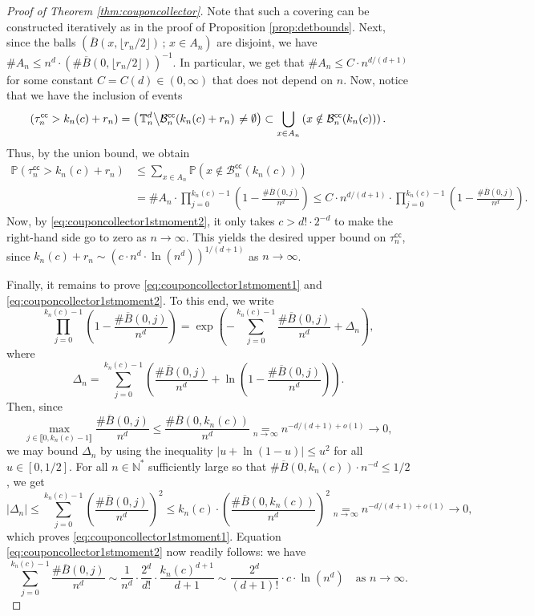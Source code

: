 \documentclass[10pt,a4paper]{amsart}
\theoremstyle{plain}
\theoremstyle{remark}
\begin{document}
\begin{proof}[Proof of Theorem \ref{thm:couponcollector}]
Note that such a covering can be constructed iteratively as in the proof of Proposition \ref{prop:detbounds}.
Next, since the balls $\left(\overline{B}(x,\lfloor r_n/2\rfloor)\,;\,x\in A_n\right)$ are disjoint, we have ${\#A_n\leq n^d\cdot\left(\#\overline{B}(0,\lfloor r_n/2\rfloor)\right)^{-1}}$.
In particular, we get that $\#A_n\leq C\cdot n^{d/(d+1)}$ for some constant $C=C(d)\in(0,\infty)$ that does not depend on $n$.
Now, notice that we have the inclusion of events
\[\left(\tau_n^\mathsf{cc}>k_n(c)+r_n\right)=\left(\left.\mathbb{T}_n^d\middle\backslash\mathcal{B}_n^\mathsf{cc}(k_n(c)+r_n)\right.\neq\emptyset\right)\subset\bigcup_{x\in A_n}\left(x\notin\mathcal{B}_n^\mathsf{cc}(k_n(c))\right).\]
Thus, by the union bound, we obtain
\[\begin{split}
\mathbb{P}\left(\tau_n^\mathsf{cc}>k_n(c)+r_n\right)&\leq\sum_{x\in A_n}\mathbb{P}\left(x\notin\mathcal{B}_n^\mathsf{cc}(k_n(c))\right)\\
&=\#A_n\cdot\prod_{j=0}^{k_n(c)-1}\left(1-\frac{\#\overline{B}(0,j)}{n^d}\right)\leq C\cdot n^{d/(d+1)}\cdot\prod_{j=0}^{k_n(c)-1}\left(1-\frac{\#\overline{B}(0,j)}{n^d}\right).
\end{split}\]
Now, by \eqref{eq:couponcollector1stmoment2}, it only takes $c>d!\cdot2^{-d}$ to make the right-hand side go to zero as $n\to\infty$.
This yields the desired upper bound on $\tau_n^\mathsf{cc}$, since $k_n(c)+r_n\sim\left(c\cdot n^d\cdot\ln\left(n^d\right)\right)^{1/(d+1)}$ as $n\to\infty$.

Finally, it remains to prove \eqref{eq:couponcollector1stmoment1} and \eqref{eq:couponcollector1stmoment2}.
To this end, we write
\[\prod_{j=0}^{k_n(c)-1}\left(1-\frac{\#\overline{B}(0,j)}{n^d}\right)=\exp\left(-\sum_{j=0}^{k_n(c)-1}\frac{\#\overline{B}(0,j)}{n^d}+\Delta_n\right),\]
where
\[\Delta_n=\sum_{j=0}^{k_n(c)-1}\left(\frac{\#\overline{B}(0,j)}{n^d}+\ln\left(1-\frac{\#\overline{B}(0,j)}{n^d}\right)\right).\]
Then, since
\[\max_{j\in\llbracket0,k_n(c)-1\rrbracket}\frac{\#\overline{B}(0,j)}{n^d}\leq\frac{\#\overline{B}(0,k_n(c))}{n^d}\underset{n\to\infty}{=}n^{-d/(d+1)+o(1)}\longrightarrow0,\]
we may bound $\Delta_n$ by using the inequality $|u+\ln(1-u)|\leq u^2$ for all $u\in[0,1/2]$.
For all $n\in\mathbb{N}^*$ sufficiently large so that $\#\overline{B}(0,k_n(c))\cdot n^{-d}\leq1/2$, we get
\[|\Delta_n|\leq\sum_{j=0}^{k_n(c)-1}\left(\frac{\#\overline{B}(0,j)}{n^d}\right)^2\leq k_n(c)\cdot\left(\frac{\#\overline{B}(0,k_n(c))}{n^d}\right)^2\underset{n\to\infty}{=}n^{-d/(d+1)+o(1)}\longrightarrow0,\]
which proves \eqref{eq:couponcollector1stmoment1}.
Equation \eqref{eq:couponcollector1stmoment2} now readily follows: we have
\[\sum_{j=0}^{k_n(c)-1}\frac{\#\overline{B}(0,j)}{n^d}\sim\frac{1}{n^d}\cdot\frac{2^d}{d!}\cdot\frac{k_n(c)^{d+1}}{d+1}\sim\frac{2^d}{(d+1)!}\cdot c\cdot\ln\left(n^d\right)\quad\text{as $n\to\infty$.}\]


\end{proof}
\end{document}
